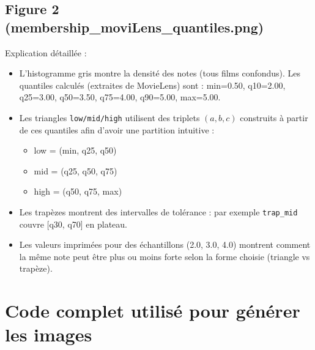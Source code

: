 \documentclass[a4paper,11pt]{article}
\begin{document}
\subsection{Figure 2 (membership\_moviLens\_quantiles.png)}
Explication détaillée :
\begin{itemize}
  \item L'histogramme gris montre la densité des notes (tous films confondus). Les quantiles calculés (extraites de MovieLens) sont : min=0.50, q10=2.00, q25=3.00, q50=3.50, q75=4.00, q90=5.00, max=5.00.
    \item Les triangles \texttt{low/mid/high} utilisent des triplets $(a,b,c)$ construits à partir de ces quantiles afin d'avoir une partition intuitive :
    \begin{itemize}
      \item low = (min, q25, q50)
      \item mid = (q25, q50, q75)
      \item high = (q50, q75, max)
    \end{itemize}
    \item Les trapèzes montrent des intervalles de tolérance : par exemple \texttt{trap\_mid} couvre [q30, q70] en plateau.
  \item Les valeurs imprimées pour des échantillons (2.0, 3.0, 4.0) montrent comment la même note peut être plus ou moins \og forte \fg{} selon la forme choisie (triangle vs trapèze).
\end{itemize}

\section{Code complet utilisé pour générer les images}
\end{document}
